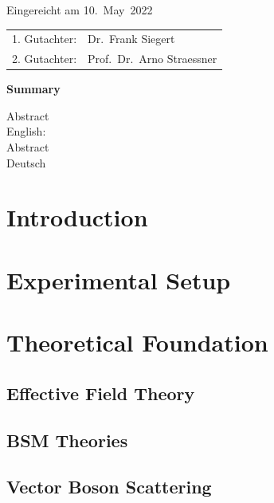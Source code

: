 \thispagestyle{empty}\vspace*{48em}

Eingereicht am 10.~May~2022\vspace{1.5em}
\par{\large\begin{tabular}{ll}
        1. Gutachter: & Dr.~Frank Siegert         \\
        2. Gutachter: & Prof.~Dr.~Arno Straessner \\
    \end{tabular}}


\newpage
\begin{center}\large\bfseries Summary\end{center}


Abstract \\
English: \\

\vspace{20em}
Abstract \\
Deutsch \\


\tableofcontents

\chapter{Introduction}

\chapter{Experimental Setup}


\chapter{Theoretical Foundation}
\section{Effective Field Theory}


\section{BSM Theories}


\section{Vector Boson Scattering}


